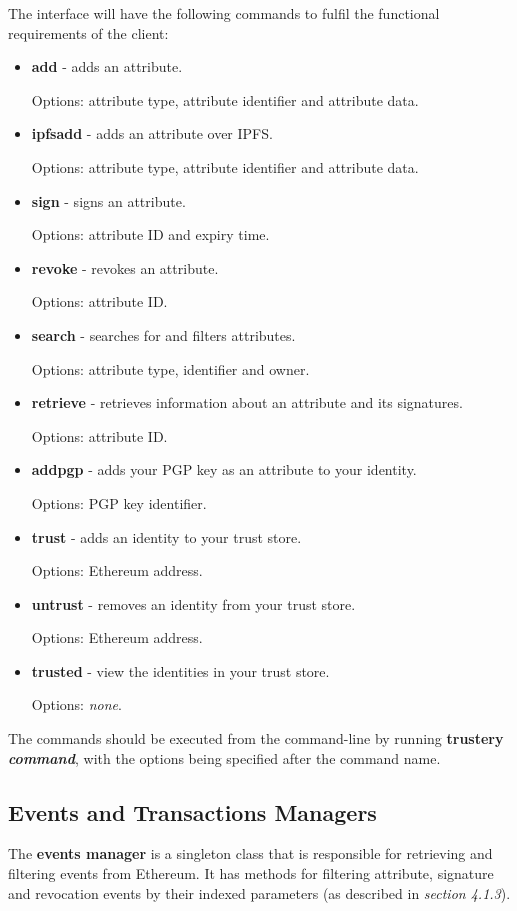 \documentclass[12pt]{report}
\begin{document}
	The interface will have the following commands to fulfil the functional requirements of the client:
	\begin{itemize}
		\item \textbf{add} - adds an attribute.
		
		Options: attribute type, attribute identifier and attribute data.
		\item \textbf{ipfsadd} - adds an attribute over IPFS.
		
		Options: attribute type, attribute identifier and attribute data.
		\item \textbf{sign} - signs an attribute.
		
		Options: attribute ID and expiry time.
		\item \textbf{revoke} - revokes an attribute.
		
		Options: attribute ID.
		
		\item \textbf{search} - searches for and filters attributes.
		
		Options: attribute type, identifier and owner.
		
		\item \textbf{retrieve} - retrieves information about an attribute and its signatures.
		
		Options: attribute ID.
		
		\item \textbf{addpgp} - adds your PGP key as an attribute to your identity.
		
		Options: PGP key identifier.
		
		\item \textbf{trust} - adds an identity to your trust store.
		
		Options: Ethereum address.
		
		\item \textbf{untrust} - removes an identity from your trust store.
		
		Options: Ethereum address.
		
		\item \textbf{trusted} - view the identities in your trust store.
		
		Options: \textit{none}.
	\end{itemize}
	
	The commands should be executed from the command-line by running \textbf{trustery \textit{command}}, with the options being specified after the command name.
	
	\subsection{Events and Transactions Managers}
	The \textbf{events manager} is a singleton class that is responsible for retrieving and filtering events from Ethereum. It has methods for filtering attribute, signature and revocation events by their indexed parameters (as described in \textit{section 4.1.3}).
	
\end{document}
